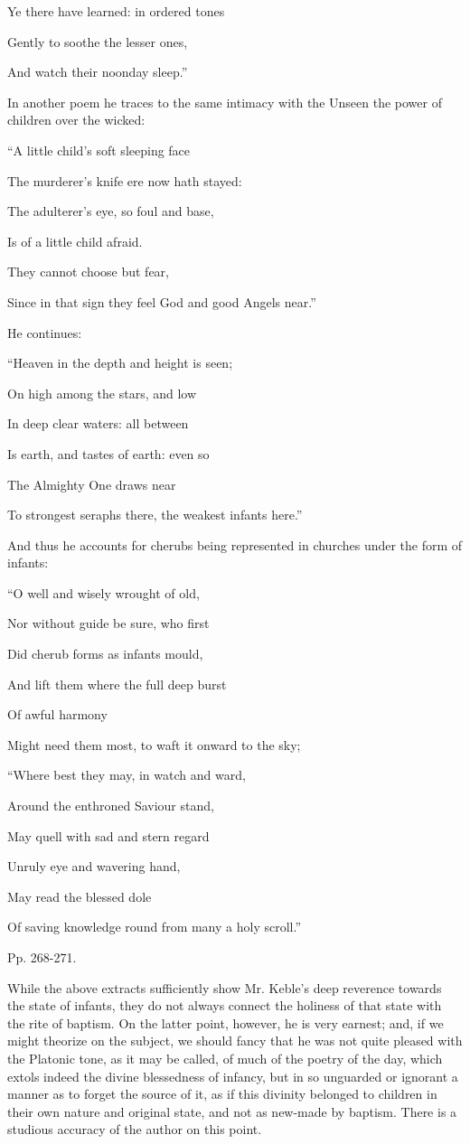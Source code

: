 Ye there have learned: in ordered tones

Gently to soothe the lesser ones,

And watch their noonday sleep.''

In another poem he traces to the same intimacy
with the Unseen the power of children over the wicked:

``A
little child's soft sleeping face

The murderer's knife ere now hath stayed:

The adulterer's eye, so foul and base,

Is of a little child afraid.

They cannot choose but
fear,

Since in that sign they feel God and good Angels near.''

He continues:

``Heaven
in the depth and height is seen;

On high among the stars, and low

In deep clear waters: all between

Is earth, and tastes of earth: even so

The Almighty One draws near

To strongest seraphs there, the weakest infants here.''

And thus he accounts for cherubs being
represented in churches under the form of infants:

``O well
and wisely wrought of old,

Nor without guide be sure, who first

Did cherub forms as infants mould,

And lift them where the full deep burst

Of awful harmony

Might need them most, to waft it onward to the sky;

``Where
best they may, in watch and ward,

Around the enthroned Saviour stand,

May quell with sad and stern regard

Unruly eye and wavering hand,

May read the blessed dole

Of saving knowledge round from many a holy scroll.''

Pp. 268-271.

While the above extracts sufficiently show Mr.
Keble's deep reverence towards the state of infants, they do not
always connect the holiness of that state with the rite of baptism. On
the latter point, however, he is very earnest; and, if we might
theorize on the subject, we should fancy that he was not quite pleased
with the Platonic tone, as it may be called, of much of the poetry of
the day, which extols indeed the divine blessedness of infancy, but in
so unguarded or ignorant a manner as to forget the source of it, as if
this divinity belonged to children in their own nature and original
state, and not as new-made by baptism. There is a studious accuracy of
the author on this point.

